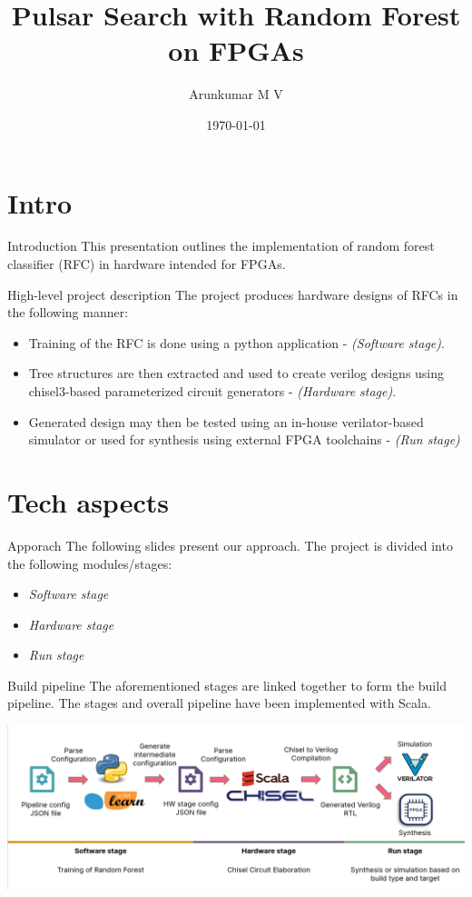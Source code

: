 \documentclass[presentation]{beamer}
\author{Arunkumar M V}
\date{\today}
\title{Pulsar Search with Random Forest on FPGAs}
\begin{document}
\maketitle

\section*{Intro}
\label{sec:org837c248}
\begin{frame}[label={sec:orgc2c5c5d}]{Introduction}
This presentation outlines the implementation of random forest classifier (RFC) in hardware intended for FPGAs.
\end{frame}

\begin{frame}[label={sec:org6d904e2}]{High-level project description}
The project produces hardware designs of RFCs in the following manner:
\begin{itemize}
\item Training of the RFC is done using a python application - \emph{(Software stage)}.
\item Tree structures are then extracted and used to create verilog designs using chisel3-based parameterized circuit generators - \emph{(Hardware stage)}.
\item Generated design may then be tested using an in-house verilator-based simulator or used for synthesis using external FPGA toolchains - \emph{(Run stage)}
\end{itemize}
\end{frame}

\section*{Tech aspects}
\label{sec:orgae2416d}
\begin{frame}[label={sec:orgbea22de}]{Apporach}
The following slides present our approach. The project is divided into the following modules/stages:
\begin{itemize}
\item \emph{Software stage}
\item \emph{Hardware stage}
\item \emph{Run stage}
\end{itemize}
\end{frame}

\begin{frame}[label={sec:orgf3cc294}]{Build pipeline}
The aforementioned stages are linked together to form the \alert{build pipeline}. The stages and overall pipeline have been implemented with Scala.
\begin{center}
\includegraphics[width=.9\linewidth]{../images/build-pipeline.png}
\end{center}
\end{frame}
\end{document}
